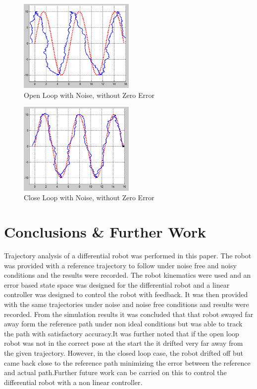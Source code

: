 \documentclass[conference]{IEEEtran}
\begin{document}
\begin{figure}[h!]
  \caption{Open Loop with Noise, without Zero Error}
  \centering
    \includegraphics[width=0.5\textwidth]{OpenNoise}
\end{figure}

\begin{figure}[h!]
  \caption{Close Loop with Noise, without Zero Error}
  \centering
    \includegraphics[width=0.5\textwidth]{CloseNoise}
\end{figure}

\section{Conclusions \& Further Work}
Trajectory analysis of a differential robot was performed in this paper. The robot was provided with a reference trajectory to follow under noise free and noisy conditions
and the results were recorded. The robot kinematics were used and an error based state space was designed for the differential robot and a linear controller was designed to control the robot with
feedback. It was then provided with the same trajectories under noise and noise free conditions and results were recorded. From the simulation results it was concluded that
that robot swayed far away form the reference path under non ideal conditions but was able to track the path with satisfactory accuracy.It was further noted that if the open loop robot was not in the correct pose at the start the it drifted very far away from the given trajectory. However, in the closed loop case,
the robot drifted off but came back close to the reference path minimizing the error between the reference and actual path.Further future work can be carried on this to
control the differential robot with a  non linear controller. 

{}


\end{document}
